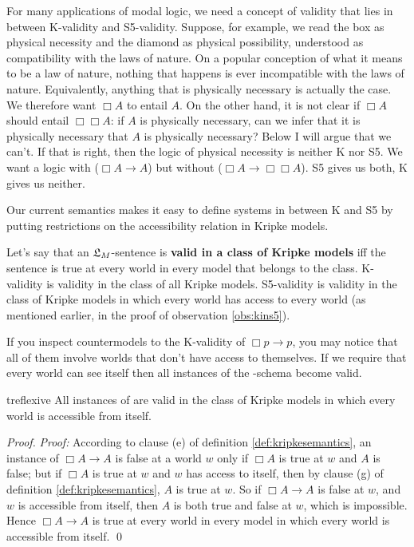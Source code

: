 For many applications of modal logic, we need a concept of validity that lies in
between K-validity and S5-validity. Suppose, for example, we read the box as
physical necessity and the diamond as physical possibility, understood as
compatibility with the laws of nature. On a popular conception of what it means
to be a law of nature, nothing that happens is ever incompatible with the laws
of nature. Equivalently, anything that is physically necessary is actually the
case. We therefore want $\Box A$ to entail $A$. On the other hand, it is not
clear if $\Box A$ should entail $\Box\Box A$: if $A$ is physically necessary,
can we infer that it is physically necessary that $A$ is physically necessary?
Below I will argue that we can't. If that is right, then the logic of physical
necessity is neither K nor S5. We want a logic with  ($\Box A \to A$)
but without  ($\Box A \to \Box\Box A$). S5 gives us both, K gives us
neither.

Our current semantics makes it easy to define systems in between K and S5 by
putting restrictions on the accessibility relation in Kripke models.

Let's say that an $\mathfrak{L}_M$-sentence is \textbf{valid in a class of Kripke models}
iff the sentence is true at every world in every model that belongs to the
class. K-validity is validity in the class of all Kripke models. S5-validity is
validity in the class of Kripke models in which every world has access to every
world (as mentioned earlier, in the proof of observation \ref{obs:kins5}).


If you inspect countermodels to the K-validity of $\Box p \to p$, you may notice
that all of them involve worlds that don't have access to themselves. If we
require that every world can see itself then all instances of the -schema
become valid.

\begin{observation}{treflexive}
  All instances of  are valid in the class of Kripke models in which every
  world is accessible from itself.
\end{observation}
%
\begin{proof}
  \emph{Proof:} According to clause (e) of definition \ref{def:kripkesemantics},
  an instance of $\Box A \to A$ is false at a world $w$ only if $\Box A$ is true
  at $w$ and $A$ is false; but if $\Box A$ is true at $w$ and $w$ has access to
  itself, then by clause (g) of definition \ref{def:kripkesemantics}, $A$ is
  true at $w$. So if $\Box A \to A$ is false at $w$, and $w$ is accessible from
  itself, then $A$ is both true and false at $w$, which is impossible. Hence
  $\Box A \to A$ is true at every world in every model in which every world is
  accessible from itself. \qed
\end{proof}

